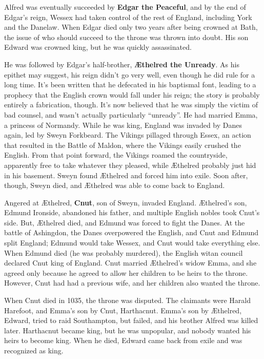 Alfred was eventually succeeded by \textbf{Edgar the Peaceful}, and by the end of Edgar's reign,
Wessex had taken control of the rest of England, including York and the Danelaw.
When Edgar died only two years after being crowned at Bath,
the issue of who should succeed to the throne was thrown into doubt.
His son Edward was crowned king, but he was quickly assassinated.

He was followed by Edgar's half-brother, \textbf{\AE{}thelred the Unready}.
As his epithet may suggest, his reign didn't go very well, even though he did rule for a long time.
It's been written that he defecated in his baptismal font,
leading to a prophecy that the English crown would fall under his reign;
the story is probably entirely a fabrication, though.
It's now believed that he was simply the victim of bad counsel, and wasn't actually particularly ``unready''.
He had married Emma, a princess of Normandy.
While he was king, England was invaded by Danes again, led by Sweyn Forkbeard.
The Vikings pillaged through Essex, an action that resulted in the Battle of Maldon,
where the Vikings easily crushed the English.
From that point forward, the Vikings roamed the countryside, apparently free to take whatever they pleased,
while \AE{}thelred probably just hid in his basement.
Sweyn found \AE{}thelred and forced him into exile.
Soon after, though, Sweyn died, and \AE{}thelred was able to come back to England.

Angered at \AE{}thelred, \textbf{Cnut}, son of Sweyn, invaded England.
\AE{}thelred's son, Edmund Ironside, abandoned his father, and multiple English nobles took Cnut's side.
But, \AE{}thelred died, and Edmund was forced to fight the Danes.
At the battle of Ashingdon, the Danes overpowered the English, and Cnut and Edmund split England;
Edmund would take Wessex, and Cnut would take everything else.
When Edmund died (he was probably murdered), the English witan council declared Cnut king of England.
Cnut married \AE{}thelred's widow Emma,
and she agreed only because he agreed to allow her children to be heirs to the throne.
However, Cnut had had a previous wife, and her children also wanted the throne.

When Cnut died in 1035, the throne was disputed.
The claimants were Harald Harefoot, and Emma's son by Cnut, Harthacnut.
Emma's son by \AE{}thelred, Edward, tried to raid Southampton, but failed, and his brother Alfred was killed later.
Harthacnut became king, but he was unpopular, and nobody wanted his heirs to become king.
When he died, Edward came back from exile and was recognized as king.

